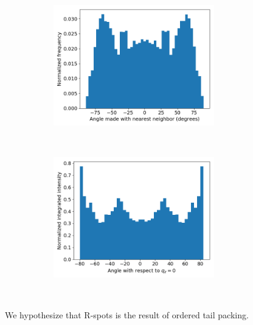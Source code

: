 \documentclass{article}
\begin{document}
\begin{figure}[!htb]
	\begin{subfigure}{\linewidth}
	\centering
		\begin{subfigure}{0.45\textwidth}
	        \centering
		        \includegraphics[width=\linewidth]{angles_traj_layered.png}
		        \caption{}~\label{fig:layered_tails}
		\end{subfigure}
		\begin{subfigure}{0.45\textwidth}
        	\centering
		        \includegraphics[width=\linewidth]{layered_angle_v_I.png}
		        \caption{}~\label{fig:layered_integration}
		\end{subfigure}
	\end{subfigure} 
  \caption{We hypothesize that R-spots is the result of ordered tail packing.
}
\end{figure}
\end{document}
